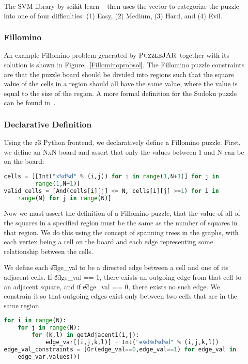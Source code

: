 The SVM library by scikit-learn ~\cite{scikitlearn} then uses the vector to categorize the
puzzle into one of four difficulties: (1) Easy, (2) Medium, (3) Hard,
and (4) Evil.

\subsubsection{Fillomino}

An example Fillomino problem generated by $\textsc{PuzzleJAR}$ together with its
solution is shown in Figure.~\ref{Fillominoprobsol}. The Fillomino puzzle constraints are that the puzzle board should be divided into regions such that the square value of the cells in a region should all have the same value, where the value is equal to the size of the region. A more formal definition for the Sudoku puzzle can be found in~\cite{fillominodef}.

\subsubsection*{Declarative Definition}
Using the z3 Python frontend, we declaratively define a Fillomino puzzle.
First, we define an NxN board and assert that only the values between
1 and N can be on the board: 

\singlespace
\begin{lstlisting}[language=python, frame=single]
cells = [[Int("x%d%d" % (i,j)) for i in range(1,N+1)] for j in
         range(1,N+1)]
valid_cells = [And(cells[i][j] <= N, cells[i][j] >=1) for i in
	range(N) for j in range(N)]
\end{lstlisting}
\doublespace

Now we must assert the definition of a Fillomino puzzle, that the
value of all of the squares in a specified region must be the same as
the number of squares in that region. We do this using the concept of
spanning trees in the graphs, with each vertex being a cell on the board
and each edge representing some relationship between the cells.

We define each \t{edge\_val} to be a directed edge between a cell and
one of its adjacent cells. If \t{edge\_val == 1}, there exists an
outgoing edge from that cell to an adjacent square, and if
\t{edge\_val == 0}, there exists no such edge. We constrain it so that
outgoing edges exist only between two cells that are in the same
region.

\singlespace
\begin{lstlisting}[language=python, frame=single]
for i in range(N):
    for j in range(N):
        for (k,l) in getAdjacent1(i,j):
            edge_var[(i,j,k,l)] = Int("e%d%d%d%d" % (i,j,k,l))
edge_val_constraints = [Or(edge_val==0,edge_val==1) for edge_val in
    edge_var.values()]
\end{lstlisting}
\doublespace

